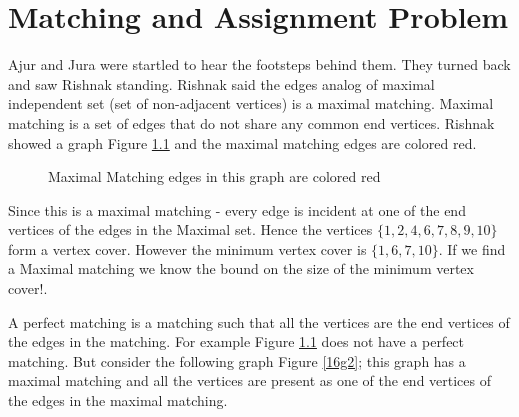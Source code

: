 \chapter{Matching and Assignment Problem}

Ajur and Jura were startled to hear the footsteps behind them. They turned back and saw Rishnak standing. Rishnak said the edges analog of maximal independent set (set of non-adjacent vertices) is a maximal matching. Maximal matching is a set of edges that do not share any common end vertices. Rishnak showed a graph Figure \ref{16g1} and the maximal matching edges are colored red.
\begin{figure}
\begin{center}

\caption{Maximal Matching edges in this graph are colored red}\label{16g1}
\end{center}
\end{figure}

Since this is a maximal matching - every edge is incident at one of the end vertices of the edges in the Maximal set. Hence the vertices $\{1,2,4,6,7,8,9,10\}$ form a vertex cover. However the minimum vertex cover is $\{1,6,7,10\}$. If we find a Maximal matching we know the bound on the size of the minimum vertex cover!.


A perfect matching is a matching such that all the vertices are the end vertices of the edges in the matching. For example Figure \ref{16g1} does not have a perfect matching.  But consider the following graph Figure \ref{16g2}; this graph has a maximal matching and all the vertices are present as one of the end vertices of the edges in the maximal matching.

